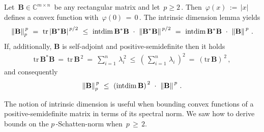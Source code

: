   \begin{example*}
    Let 
    $
    \,
      \mathbf{B} \in \mathbb{C}^{m\times n}
      \,
    $
    be any rectangular matrix and let $\,p\ge 2\,$.
    Then 
    $
    \,
      \varphi(x)
      \,
      :=
      \,
      \left| x \right|
      \,
    $
  defines a convex function with $\,\varphi(0)\,=\,0\,$.
  The intrinsic dimension lemma yields
  \begin{gather*}
    \norm{\mathbf{B}}^{\,p}_p
    \ 
    =
    \ 
    \mathrm{tr}
      \left|
      \mathbf{B}^* \mathbf{B}
      \right|
      ^{\,p/2}
      \ 
    \le
    \ 
    \mathrm{intdim}
    \,
      \mathbf{B}^* \mathbf{B}
      \ 
      \cdot
      \ 
      \norm{
      \mathbf{B}^* \mathbf{B}
    }^{\,p/2}
    \ 
    =
    \ 
    \mathrm{intdim}
    \,
      \mathbf{B}^* \mathbf{B}
      \ 
      \cdot
      \ 
      \norm{
        \mathbf{B}
    }^{\,p}
    \,.
  \end{gather*}
  If, additionally, $\mathbf{B}$ is self-adjoint and positive-semidefinite
  then it holds 
  \begin{gather*}
    \mathrm{tr}
    \,
      \mathbf{B}^* \mathbf{B}
      \ 
    =
    \ 
    \mathrm{tr}
    \,
    \mathbf{B}^{\,2}
    \ 
    =
    \ 
    \sum_{i=1}^{n} 
    \,
    \lambda_i^{\,2}
    \ 
    \le 
    \ 
    \left( 
      \,
    \sum_{i=1}^{n} 
    \,
    \lambda_i
    \,
    \right)
    ^{\!2}
    \ 
    =
    \ 
    \left( 
    \mathrm{tr}
    \,
    \mathbf{B}
    \right)
    ^{\,2}
    \,,
  \end{gather*}
  and consequently
  \begin{gather*}
    \norm{\mathbf{B}}^{\,p}_{p}
    \ 
    \le
    \ 
    \left( 
    \mathrm{intdim}
    \,
    \mathbf{B}
    \right)
    ^{\,2}
    \ 
      \cdot
      \ 
      \norm{
        \mathbf{B}
    }^{\,p}
    \,.
  \end{gather*}
  \end{example*}
\begin{takeaways}
  The notion of intrinsic dimension is useful when bounding convex functions of a positive-semidefinite matrix in terms of its spectral norm.
  We saw how to derive bounds on the $p\,$-Schatten-norm when $\,p\,\ge\, 2$.
\end{takeaways}
